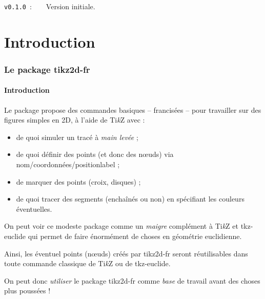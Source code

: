 \documentclass[french,a4paper,11pt]{article}
\providecommand\tikzlogo{Ti\textit{k}Z}
\let\TikZ\tikzlogo
\begin{document}
\verb|v0.1.0|~:~~~~Version initiale.

\newpage

\part{Introduction}

\section{Le package tikz2d-fr}

\subsection{Introduction}

\begin{noteblock}
Le package propose des commandes basiques -- francisées -- pour travailler sur des figures simples en 2D, à l'aide de \TikZ{} avec :

\begin{itemize}
	\item de quoi simuler un tracé à \textit{main levée} ;
	\item de quoi définir des points (et donc des nœuds) via \textsf{nom/coordonnées/positionlabel} ;
	\item de marquer des points (croix, disques) ;
	\item de quoi tracer des segments (enchaînés ou non) en spécifiant les couleurs éventuelles.
\end{itemize}
\vspace*{-\baselineskip}\leavevmode
\end{noteblock}

\begin{importantblock}
On peut voir ce modeste package comme un \textit{maigre} complément à \TikZ{} et \textsf{tkz-euclide}\footnotemark{} qui permet de faire énormément de choses en géométrie euclidienne.

\smallskip

Ainsi, les éventuel points (nœuds) créés par \textsf{tikz2d-fr} seront réutilisables dans toute commande classique de \TikZ{} ou de \textsf{tkz-euclide}.

\smallskip

On peut donc \textit{utiliser} le package \textsf{tikz2d-fr} comme \textit{base} de travail avant des choses plus poussées !
\end{importantblock}
\end{document}

